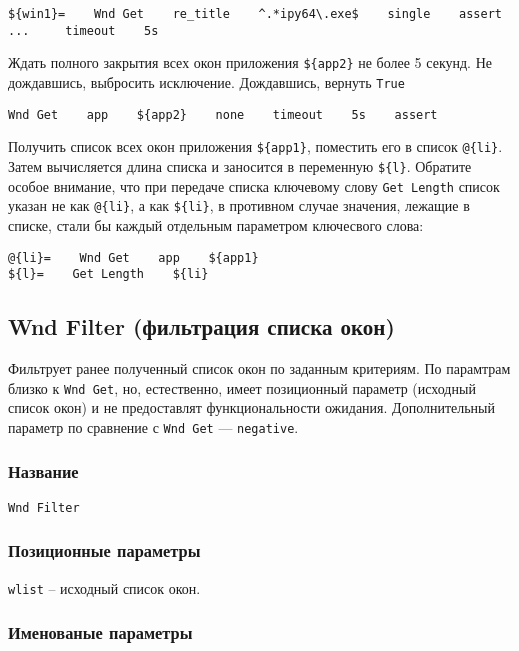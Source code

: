 \documentclass[11pt]{book} %
\begin{document}
\begin{verbatim}
${win1}=    Wnd Get    re_title    ^.*ipy64\.exe$    single    assert
...     timeout    5s
\end{verbatim}

Ждать полного закрытия всех окон приложения \verb"${app2}" не более 5 секунд. Не дождавшись, выбросить исключение. Дождавшись, вернуть \verb"True"
\begin{verbatim}
Wnd Get    app    ${app2}    none    timeout    5s    assert
\end{verbatim}

Получить список всех окон приложения \verb"${app1}", поместить его в список \verb"@{li}". Затем вычисляется длина списка и заносится в переменную \verb"${l}". Обратите особое внимание, что при передаче списка ключевому слову \verb"Get Length" список указан не как \verb"@{li}", а как \verb"${li}", в противном случае значения, лежащие в списке, стали бы каждый отдельным параметром ключесвого слова:
\begin{verbatim}
@{li}=    Wnd Get    app    ${app1}
${l}=    Get Length    ${li}
\end{verbatim}



\subsection{Wnd Filter (фильтрация списка окон)}
Фильтрует ранее полученный список окон по заданным критериям. По парамтрам близко к \verb"Wnd Get", но, естественно, имеет позиционный параметр (исходный список окон) и не предоставлят функциональности ожидания. Дополнительный параметр по сравнение с \verb"Wnd Get" --- \verb"negative".

\subsubsection*{Название}
\verb"Wnd Filter"

\subsubsection*{Позиционные параметры} 

\verb"wlist" -- исходный список окон.

\subsubsection*{Именованые параметры} 
\end{document}
